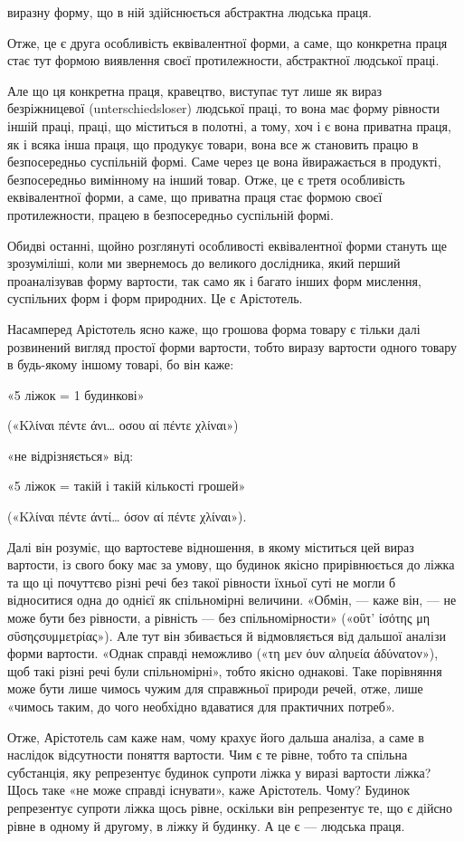 \parcont{}  %
виразну форму, що в ній здійснюється абстрактна людська праця.

Отже, це є друга особливість еквівалентної форми, а саме, що конкретна праця стає тут формою
виявлення своєї протилежности,
абстрактної людської праці.

Але що ця конкретна праця, кравецтво, виступає тут лише як вираз безріжницевої (unterschiedsloser)
людської праці, то вона має форму рівности іншій праці, праці, що міститься в полотні, а тому, хоч і
є вона приватна праця, як і всяка інша праця, що продукує товари, вона все ж становить працю в
безпосередньо суспільній формі. Саме через це вона йвиражається в продукті, безпосередньо вимінному
на інший товар. Отже, це є третя особливість еквівалентної форми, а саме, що приватна праця стає
формою своєї протилежности, працею в безпосередньо суспільній формі.

Обидві останні, щойно розглянуті особливості еквівалентної форми стануть ще зрозуміліші, коли ми
звернемось до великого дослідника, який перший проаналізував форму вартости, так само як і багато
інших форм мислення, суспільних форм і форм природних. Це є Арістотель.

Насамперед Арістотель ясно каже, що грошова форма товару є тільки далі розвинений вигляд простої
форми вартости, тобто виразу вартости одного товару в будь-якому іншому товарі, бо він каже:

«5 ліжок = 1 будинкові»

(«Κλίναι πέντε άνι\dots{} οσου αί πέντε χλίναι»)

«не відрізняється» від:

«5 ліжок = такій і такій кількості грошей»

(«Κλίναι πέντε άντί\dots{} όσον αί πέντε χλίναι»).

Далі він розуміє, що вартостеве відношення, в якому міститься цей вираз вартости, із свого боку має
за умову, що будинок якісно прирівнюється до ліжка та що ці почуттєво різні речі без такої рівности
їхньої суті не могли б відноситися одна до однієї як спільномірні величини. «Обмін, — каже він, — не
може бути без рівности, а рівність — без спільномірности» («οΰτ’ ίσότης μη σΰσηςσυμμετρίας»). Але
тут він збивається й відмовляється від дальшої аналізи форми вартости. «Однак справді неможливо («τη
μεν όυν αληυεία άδύνατον»), щоб такі різні речі були спільномірні», тобто якісно однакові. Таке
порівняння може бути лише чимось чужим для справжньої природи речей, отже, лише «чимось таким, до
чого необхідно вдаватися для практичних потреб».

Отже, Арістотель сам каже нам, чому крахує його дальша аналіза, а саме в наслідок відсутности
поняття вартости. Чим є те рівне, тобто та спільна субстанція, яку репрезентує будинок супроти ліжка
у виразі вартости ліжка? Щось таке «не може справді існувати», каже Арістотель. Чому? Будинок
репрезентує супроти ліжка щось рівне, оскільки він репрезентує те, що є дійсно рівне в одному й
другому, в ліжку й будинку. А це є — людська праця.

